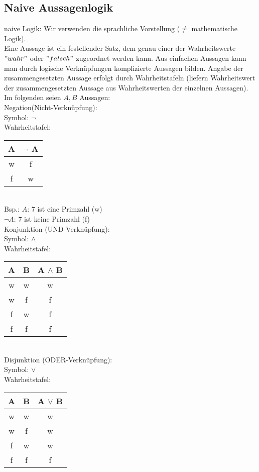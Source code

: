 \documentclass[10pt,a4paper,numbers=endperiod]{scrartcl}
\theoremstyle{definition}
\begin{document}
\onehalfspacing

\subsection{Naive Aussagenlogik}
naive Logik: Wir verwenden die sprachliche Vorstellung ($\neq$ {mathematische Logik}).\\

Eine Aussage ist ein festellender Satz, dem genau einer der Wahrheitswerte $"wahr"$ oder $"falsch"$ zugeordnet werden kann. Aus einfachen Aussagen kann man durch logische Verknüpfungen komplizierte Aussagen bilden. Angabe der zusammengesetzten Aussage erfolgt durch Wahrheitstafeln (liefern Wahrheitswert der zusammengesetzten Aussage aus Wahrheitswerten der einzelnen Aussagen).\\
Im folgenden seien $A, B$ Aussagen:\\

Negation(Nicht-Verknüpfung):\\
Symbol: $\neg$\\
Wahrheitstafel: 
\begin{tabular}{c|c}
	A & $\neg$ A \\
	\hline
	w & f \\
	f & w \\
\end{tabular}\\

Bsp.: $A$: 7 ist eine Primzahl (w)\\
$\neg A$: 7 ist keine Primzahl (f)\\

Konjunktion (UND-Verknüpfung):\\
Symbol: $\wedge$\\
Wahrheitstafel: 
\begin{tabular}{|c|c|c}
	A & B & A $\wedge$ B \\
	\hline
	w & w & w \\
	w & f & f \\
	f & w & f \\
	f & f & f \\
\end{tabular}\\
	
Disjunktion (ODER-Verknüpfung):\\
Symbol: $\vee$\\
Wahrheitstafel: 
\begin{tabular}{c|c|c}
	A & B & A $\vee$ B \\
	\hline
	w & w & w \\
	w & f & w \\
	f & w & w \\
	f & f & f \\
\end{tabular}\\
\end{document}

